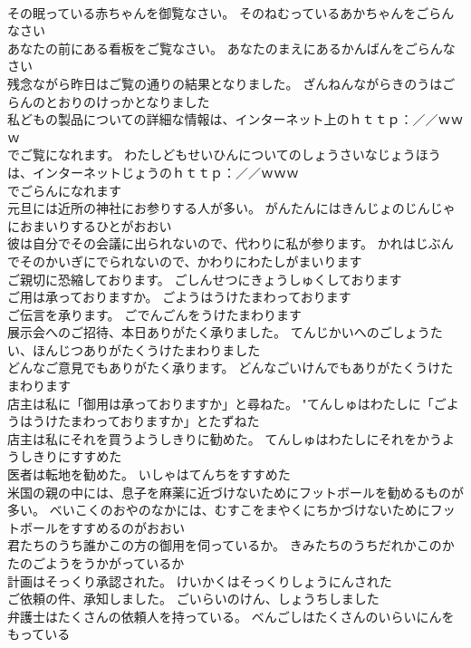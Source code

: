 \documentclass[8pt]{extreport}
\begin{document}
\begin{CJK}{UTF8}{min}
\\	その眠っている赤ちゃんを御覧なさい。	そのねむっているあかちゃんをごらんなさい 
\\	あなたの前にある看板をご覧なさい。	あなたのまえにあるかんばんをごらんなさい 
\\	残念ながら昨日はご覧の通りの結果となりました。	ざんねんながらきのうはごらんのとおりのけっかとなりました 
\\	私どもの製品についての詳細な情報は、インターネット上のｈｔｔｐ：／／ｗｗｗ
\\	でご覧になれます。	わたしどもせいひんについてのしょうさいなじょうほうは、インターネットじょうのｈｔｔｐ：／／ｗｗｗ
\\	でごらんになれます 
\\	元旦には近所の神社にお参りする人が多い。	がんたんにはきんじょのじんじゃにおまいりするひとがおおい 
\\	彼は自分でその会議に出られないので、代わりに私が参ります。	かれはじぶんでそのかいぎにでられないので、かわりにわたしがまいります 
\\	ご親切に恐縮しております。	ごしんせつにきょうしゅくしております 
\\	ご用は承っておりますか。	ごようはうけたまわっております 
\\	ご伝言を承ります。	ごでんごんをうけたまわります 
\\	展示会へのご招待、本日ありがたく承りました。	てんじかいへのごしょうたい、ほんじつありがたくうけたまわりました 
\\	どんなご意見でもありがたく承ります。	どんなごいけんでもありがたくうけたまわります 
\\	店主は私に「御用は承っておりますか」と尋ねた。	"てんしゅはわたしに「ごようはうけたまわっておりますか」とたずねた 
\\	店主は私にそれを買うようしきりに勧めた。	てんしゅはわたしにそれをかうようしきりにすすめた 
\\	医者は転地を勧めた。	いしゃはてんちをすすめた 
\\	米国の親の中には、息子を麻薬に近づけないためにフットボールを勧めるものが多い。	べいこくのおやのなかには、むすこをまやくにちかづけないためにフットボールをすすめるのがおおい 
\\	君たちのうち誰かこの方の御用を伺っているか。	きみたちのうちだれかこのかたのごようをうかがっているか 
\\	計画はそっくり承認された。	けいかくはそっくりしょうにんされた 
\\	ご依頼の件、承知しました。	ごいらいのけん、しょうちしました 
\\	弁護士はたくさんの依頼人を持っている。	べんごしはたくさんのいらいにんをもっている 

\end{CJK}
\end{document}
